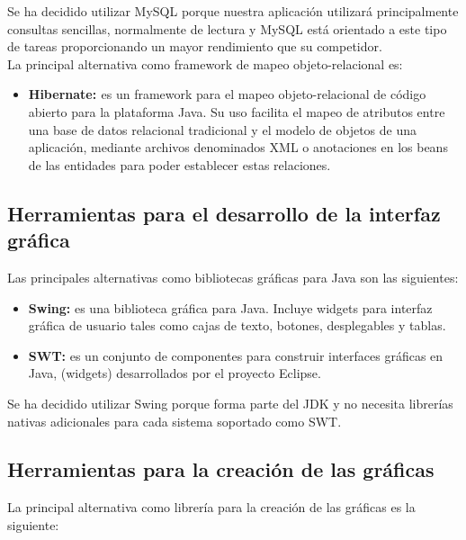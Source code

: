 \documentclass[12pt, a4paper]{book}
\begin{document}
Se ha decidido utilizar MySQL porque nuestra aplicación utilizará principalmente consultas sencillas, normalmente de lectura y MySQL está orientado a este tipo de tareas proporcionando un mayor rendimiento que su competidor.\\  

La principal alternativa como framework de mapeo objeto-relacional es:

\begin{itemize}
	
	\item \textbf{Hibernate: \label{hibernate}} es un framework para el mapeo objeto-relacional de código abierto para la plataforma Java. Su uso facilita el mapeo de atributos entre una base de datos relacional tradicional y el modelo de objetos de una aplicación, mediante archivos denominados \gls{XML} o anotaciones en los beans de las entidades para poder establecer estas relaciones.
	
\end{itemize}	



\subsection{Herramientas para el desarrollo de la interfaz gráfica}

Las principales alternativas como bibliotecas gráficas para Java son las siguientes:

\begin{itemize}
	\item \textbf{Swing:\label{swing}} es una biblioteca gráfica para Java. Incluye widgets para interfaz gráfica de usuario tales como cajas de texto, botones, desplegables y tablas.
	
	\item \textbf{SWT:} es un conjunto de componentes para construir interfaces gráficas en Java, (widgets) desarrollados por el proyecto Eclipse. 
\end{itemize}

Se ha decidido utilizar Swing porque forma parte del \gls{JDK} y no necesita librerías nativas adicionales para cada sistema soportado como SWT.

\subsection{Herramientas para la creación de las gráficas}

La principal alternativa como librería para la creación de las gráficas es la siguiente:
\end{document}
